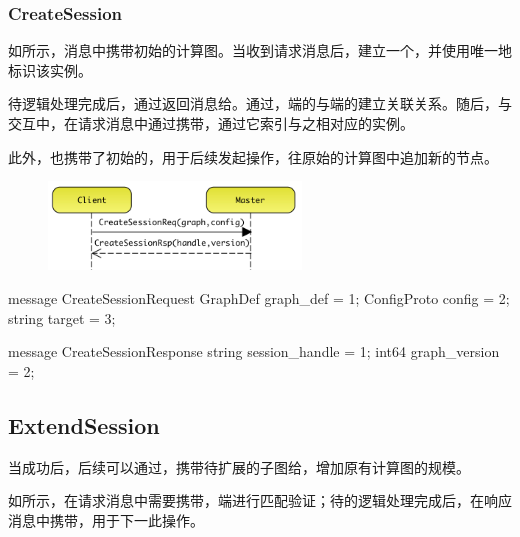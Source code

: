 \begin{content}
\begin{content}
\subsubsection{CreateSession}

如所示，消息中携带初始的计算图。当收到请求消息后，建立一个，并使用唯一地标识该实例。

待逻辑处理完成后，通过返回消息给。通过，端的与端的建立关联关系。随后，与交互中，在请求消息中通过携带，通过它索引与之相对应的实例。

此外，也携带了初始的，用于后续发起操作，往原始的计算图中追加新的节点。

\begin{figure}[H]
\centering
\includegraphics[width=0.6\textwidth]{figures/dist-ms-create-sess-req.png}
\caption{}
 \label{fig:dist-ms-create-sess-req}
\end{figure}

\begin{leftbar}
\begin{c++}
message CreateSessionRequest {
  GraphDef graph_def = 1;
  ConfigProto config = 2;
  string target = 3;
}

message CreateSessionResponse {
  string session_handle = 1;
  int64 graph_version = 2;
}
\end{c++}
\end{leftbar}

\subsection{ExtendSession}

当成功后，后续可以通过，携带待扩展的子图给，增加原有计算图的规模。

如所示，在请求消息中需要携带，端进行匹配验证；待的逻辑处理完成后，在响应消息中携带，用于下一此操作。


\end{content}
\end{content}

